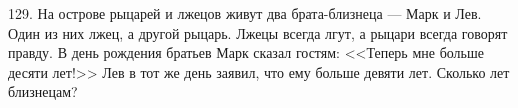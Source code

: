 129. На острове рыцарей и лжецов живут два брата-близнеца --- Марк и Лев. Один из них лжец, а другой рыцарь. Лжецы всегда лгут, а рыцари всегда говорят правду. В день рождения братьев Марк сказал гостям: <<Теперь мне больше десяти лет!>> Лев в тот же день заявил, что ему больше девяти лет. Сколько лет близнецам?\\

